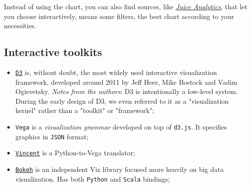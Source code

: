 Instead of using the chart, you can also find sources, like \href{http://www.juiceanalytics.com}{\emph{Juice Analytics}}, that let you choose interactively, means some filters, the best chart according to your necessities.

\subsection{Interactive toolkits}

\begin{itemize}
\item \href{https://d3js.org}{\texttt{D3}} is, without doubt, the most widely used interactive visualization framework, developed around 2011 by Jeff Heer, Mike Bostock and Vadim Ogievetsky. \emph{Notes from the authors}: D3 is intentionally a low-level system. During the early design of D3, we even referred to it as a "visualization kernel" rather than a "toolkit" or "framework";

\item \texttt{Vega} is a \emph{visualization grammar} developed on top of \texttt{d3.js}. It specifies graphics in \texttt{JSON} format;

\item \href{https://vega.github.io/vega/}{\texttt{Vincent}} is a Python-to-Vega translator;

\item \href{http://bokeh.pydata.org/en/latest/}{\texttt{Bokeh}} is an independent Viz library focused more heavily on big data visualization. Has both \texttt{Python} and \texttt{Scala} bindings; 

\end{itemize}
